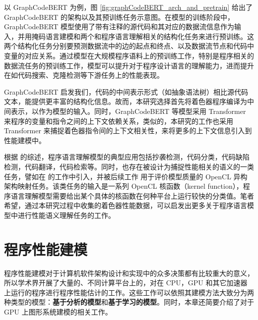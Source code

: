以 GraphCodeBERT 为例，图 \ref{fig:graphCodeBERT_arch_and_pretrain} 给出了 GraphCodeBERT 的架构以及其预训练任务示意图。在模型的训练阶段中，GraphCodeBERT 模型使用了带有注释的源代码和其对应的数据流信息作为输入，并用掩码语言建模和两个和程序语言理解相关的结构化任务来进行预训练。这两个结构化任务分别要预测数据流中的边的起点和终点、以及数据流节点和代码中变量的对应关系。通过模型在大规模程序语料上的预训练工作，特别是程序相关的数据流任务的预训练工作，模型可以提升对于程序设计语言的理解能力，进而提升在如代码搜索、克隆检测等下游任务上的性能表现。

GraphCodeBERT 启发我们，代码的中间表示形式（如抽象语法树）相比源代码文本，能提供更丰富的结构化信息。故而，本研究选择首先将着色器程序编译为中间表示，以作为模型的输入。同时，GraphCodeBERT 等模型采用 Transformer 来程序的变量和指令之间的上下文依赖关系，类似的，本研究的工作也采用 Transformer 来捕捉着色器指令间的上下文相关性，来将更多的上下文信息引入到性能建模中。

根据 \citet{ijcai2022p775} 的综述，程序语言理解模型的典型应用包括抄袭检测，代码分类，代码缺陷检测，代码翻译，代码检索等。同时，也存在被设计为捕捉性能相关的语义的一类任务，譬如在 \citet{8091247} 的工作中引入，并被后续工作 \cite{pmlr-v139-peng21b, pmlr-v139-cummins21a} 用于评价模型质量的 OpenCL 异构架构映射任务。该类任务的输入是一系列 OpenCL 核函数（kernel function），程序语言理解模型需要给出某个具体的核函数在何种平台上运行较快的分类值。笔者希望，通过本研究过程中收集的着色器性能数据，可以启发出更多关于程序语言模型中进行性能语义理解任务的工作。

\section{程序性能建模}

程序性能建模对于计算机软件架构设计和实现中的众多决策都有比较重大的意义，所以学术界开展了大量的、不同计算平台上的，对在 CPU，GPU 和其它加速器上运行的程序进行程序性能估计的工作。这些工作可以依照其建模方法大致分为两种类型的模型：\textbf{基于分析的模型}和\textbf{基于学习的模型}。同时，本章还简要介绍了对于 GPU 上图形系统建模的相关工作。


